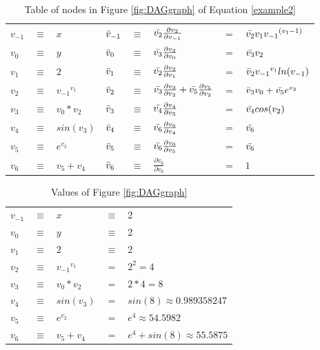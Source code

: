 \documentclass{article}
\begin{document}
\begin{table}[h!]
    \centering
    \begin{tabular}{|lcl|lclll|}
        \hline
        $v_{-1}$ & $\equiv$ & $x$ & $\Bar{v}_{-1}$ & $\equiv$ & $\Bar{v_2}\frac{\partial{v_2}}{\partial{v_{-1}}}$ & $=$ & $\Bar{v_2}v_1 {v_{-1}}^{(v_{1}-1)}$\\
        $v_{0}$ & $\equiv$ & $y$ & $\Bar{v}_{0}$ & $\equiv$ & $\Bar{v_3}\frac{\partial{v_3}}{\partial{v_0}}$ & $=$ & $\Bar{v_3}v_2$\\
        \hline
        $v_{1}$ & $\equiv$ & $2$ & $\Bar{v}_{1}$ & $\equiv$ & $\Bar{v_2}\frac{\partial{v_2}}{\partial{v_1}}$ & $=$ & $\Bar{v}_{2}{v_{-1}}^{v_{1}}ln(v_{-1})$\\
        $v_{2}$ & $\equiv$ & ${v_{-1}}^{v_{1}}$ & $\Bar{v}_{2}$ & $\equiv$ & $\Bar{v_3}\frac{\partial{v_3}}{\partial{v_2}} + \Bar{v_5}\frac{\partial{v_5}}{\partial{v_2}}$ & $=$ & $\Bar{v}_{3}v_0 + \Bar{v_5}e^{v_2}$\\
        $v_{3}$ & $\equiv$ & ${v_{0}}*{v_{2}}$ & $\Bar{v}_{3}$ & $\equiv$ & $\Bar{v_4}\frac{\partial{v_4}}{\partial{v_3}}$ & $=$ & $\Bar{v_4}cos(v_2)$\\
        $v_{4}$ & $\equiv$ & $sin(v_3)$ & $\Bar{v}_{4}$ & $\equiv$ & $\Bar{v_6}\frac{\partial{v_6}}{\partial{v_4}}$ & $=$ & $\Bar{v_6}$\\
        $v_{5}$ & $\equiv$ & $e^{v_2}$ & $\Bar{v}_{5}$ & $\equiv$ & $\Bar{v_6}\frac{\partial{v_6}}{\partial{v_5}}$ & $=$ & $\Bar{v_6}$\\
        \hline
        $v_{6}$ & $\equiv$ & $v_5 + v_4$ & $\Bar{v}_{6}$ & $\equiv$ & $\frac{\partial{v_6}}{\partial{v_6}}$ & $=$ & $1$\\
        \hline
    \end{tabular}
    \caption{Table of nodes in Figure \ref{fig:DAGgraph} of Equation \ref{example2}}
    \label{tab:example1}
\end{table}

\begin{table}[h!]
    \centering
    \begin{tabular}{|lclll|}
        \hline
        $v_{-1}$ & $\equiv$ & $x$ & $\equiv$ & 2\\
        $v_{0}$ & $\equiv$ & $y$ & $\equiv$ & 2\\
        \hline
        $v_{1}$ & $\equiv$ & $2$ & $\equiv$ & 2\\
        $v_{2}$ & $\equiv$ & ${v_{-1}}^{v_{1}}$ & $=$ & $ 2^2 = 4$\\
        $v_{3}$ & $\equiv$ & $v_0 * v_2$ & $=$ & $ 2 * 4 = 8$\\
        $v_{4}$ & $\equiv$ & $sin(v_3)$ & $=$ & $ sin(8) \approx 0.989358247$\\
        $v_{5}$ & $\equiv$ & $e^{v_2}$ & $=$ & $ e^4 \approx 54.5982$\\
        \hline
        $v_{6}$ & $\equiv$ & $v_5 + v_4$ & $=$ & $e^4 + sin(8) \approx 55.5875$\\
        \hline
    \end{tabular}
    \caption{Values of Figure \ref{fig:DAGgraph}}
    \label{tab:example1FM}
\end{table}
\end{document}
